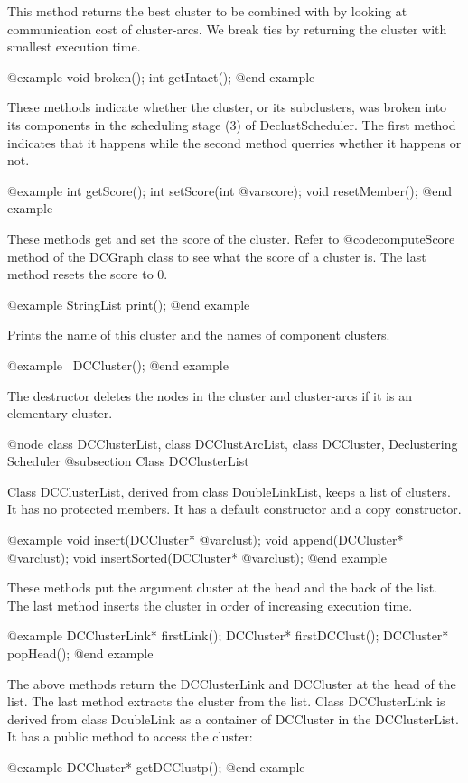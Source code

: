 This method returns the best cluster to be combined with by looking at
communication cost of cluster-arcs. We break ties by returning the 
cluster with smallest execution time.

@example
void broken();
int getIntact();
@end example

These methods indicate whether the cluster, or its subclusters, was broken
into its components in the scheduling stage (3) of DeclustScheduler.
The first method indicates that it happens while the second method
querries whether it happens or not.

@example
int getScore();
int setScore(int @var{score});
void resetMember();
@end example

These methods get and set the score of the cluster. Refer to
@code{computeScore} method of the DCGraph class to see what the score of
a cluster is. The last method resets the score to 0.

@example
StringList print();
@end example

Prints the name of this cluster and the names of component clusters.

@example
~DCCluster();
@end example

The destructor deletes the nodes in the cluster and cluster-arcs
if it is an elementary cluster.

@node class DCClusterList, class DCClustArcList, class DCCluster, Declustering Scheduler
@subsection Class DCClusterList

Class DCClusterList, derived from class DoubleLinkList, keeps a list of
clusters. It has no protected members. 
It has a default constructor and a copy constructor.

@example
void insert(DCCluster* @var{clust});
void append(DCCluster* @var{clust});
void insertSorted(DCCluster* @var{clust});
@end example

These methods put the argument cluster at the head and the back of the list.
The last method inserts the cluster in order of increasing execution time.

@example
DCClusterLink* firstLink();
DCCluster* firstDCClust();
DCCluster* popHead();
@end example

The above methods return the DCClusterLink and DCCluster at the head of the
list. The last method extracts the cluster from the list.
Class DCClusterLink is derived from class DoubleLink as a
container of DCCluster in the DCClusterList. It has a public method to
access the cluster:

@example
DCCluster* getDCClustp();
@end example

